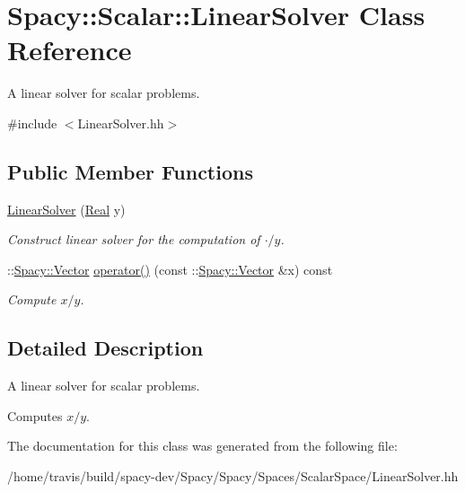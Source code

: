 \hypertarget{classSpacy_1_1Scalar_1_1LinearSolver}{\section{Spacy\-:\-:Scalar\-:\-:Linear\-Solver Class Reference}
\label{classSpacy_1_1Scalar_1_1LinearSolver}
}


A linear solver for scalar problems.  




{\ttfamily \#include $<$Linear\-Solver.\-hh$>$}

\subsection*{Public Member Functions}
\begin{DoxyCompactItemize}
\item 
\hypertarget{classSpacy_1_1Scalar_1_1LinearSolver_af7d7759b5ee27d7a16640baf1fa663d9}{\hyperlink{classSpacy_1_1Scalar_1_1LinearSolver_af7d7759b5ee27d7a16640baf1fa663d9}{Linear\-Solver} (\hyperlink{classSpacy_1_1Real}{Real} y)}\label{classSpacy_1_1Scalar_1_1LinearSolver_af7d7759b5ee27d7a16640baf1fa663d9}

\begin{DoxyCompactList}\small\item\em Construct linear solver for the computation of $\cdot/y$. \end{DoxyCompactList}\item 
\hypertarget{classSpacy_1_1Scalar_1_1LinearSolver_a2acd32e9eede5a5e868c85a8f62b757b}{\-::\hyperlink{classSpacy_1_1Vector}{Spacy\-::\-Vector} \hyperlink{classSpacy_1_1Scalar_1_1LinearSolver_a2acd32e9eede5a5e868c85a8f62b757b}{operator()} (const \-::\hyperlink{classSpacy_1_1Vector}{Spacy\-::\-Vector} \&x) const }\label{classSpacy_1_1Scalar_1_1LinearSolver_a2acd32e9eede5a5e868c85a8f62b757b}

\begin{DoxyCompactList}\small\item\em Compute $x/y$. \end{DoxyCompactList}\end{DoxyCompactItemize}


\subsection{Detailed Description}
A linear solver for scalar problems. 

Computes $x/y$. 

The documentation for this class was generated from the following file\-:\begin{DoxyCompactItemize}
\item 
/home/travis/build/spacy-\/dev/\-Spacy/\-Spacy/\-Spaces/\-Scalar\-Space/Linear\-Solver.\-hh\end{DoxyCompactItemize}
